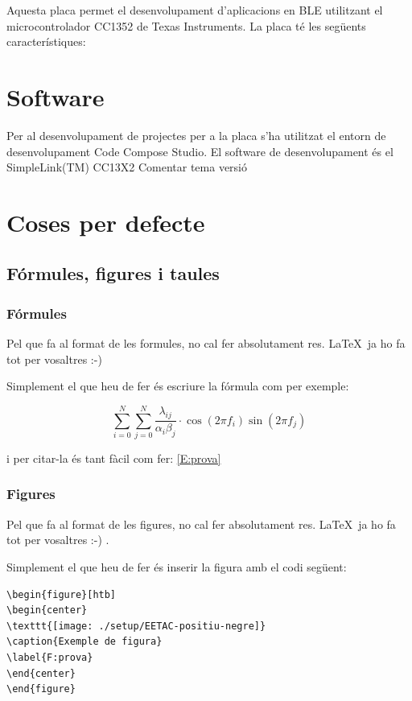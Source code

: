 Aquesta placa permet el desenvolupament d'aplicacions en BLE utilitzant el microcontrolador CC1352 de Texas Instruments.
La placa té les següents característiques:


\section{Software}
Per al desenvolupament de projectes per a la placa s'ha utilitzat el entorn de desenvolupament Code Compose Studio. El software de desenvolupament és el SimpleLink(TM) CC13X2
Comentar tema versió

\section{Coses per defecte}
\subsection{Fórmules, figures i taules}

\subsubsection{Fórmules}

Pel que fa al format de les formules, no cal fer absolutament res. \LaTeX \ ja ho fa tot per vosaltres :-)  

Simplement el que heu de fer és escriure la fórmula com per exemple:

\begin{equation}\label{E:prova}
\sum _{i=0}^{N} \sum _{j=0}^{N} \frac{\lambda _{ij}}{\alpha _i \beta_ j} \cdot \cos (2\pi f_i) \sin(2 \pi f_j)
\end{equation}

i per citar-la és tant fàcil com fer: \ref{E:prova}

\subsubsection{Figures}

Pel que fa al format de les figures, no cal fer absolutament res. \LaTeX \ ja ho fa tot per vosaltres :-) . 

Simplement el que heu de fer és inserir la figura amb el codi següent:

\begin{verbatim}
\begin{figure}[htb]
\begin{center}
\texttt{[image: ./setup/EETAC-positiu-negre]}
\caption{Exemple de figura}
\label{F:prova}
\end{center}
\end{figure}
\end{verbatim}

